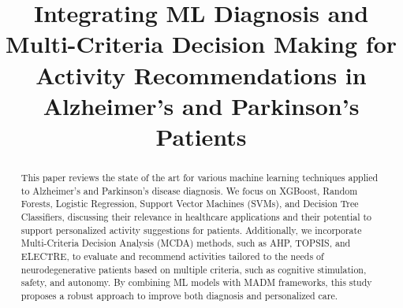 \documentclass[conference]{IEEEtran}
\begin{document}
\title{Integrating ML Diagnosis and Multi-Criteria Decision Making for Activity Recommendations in Alzheimer’s and Parkinson’s Patients}

\author{
\and
{}
\and
{}
\and
{}
\and
{}
}

\maketitle

\begin{abstract}
This paper reviews the state of the art for various machine learning techniques applied to Alzheimer’s and Parkinson’s disease diagnosis. We focus on XGBoost, Random Forests, Logistic Regression, Support Vector Machines (SVMs), and Decision Tree Classifiers, discussing their relevance in healthcare applications and their potential to support personalized activity suggestions for patients. Additionally, we incorporate Multi-Criteria Decision Analysis (MCDA) methods, such as AHP, TOPSIS, and ELECTRE, to evaluate and recommend activities tailored to the needs of neurodegenerative patients based on multiple criteria, such as cognitive stimulation, safety, and autonomy. By combining ML models with MADM frameworks, this study proposes a robust approach to improve both diagnosis and personalized care.
\end{abstract}
\end{document}
